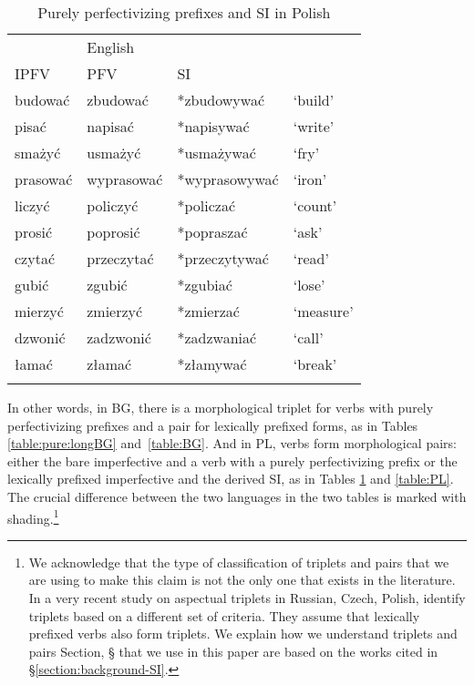 \documentclass[output=paper,colorlinks,citecolor=brown]{langscibook}
\begin{document}
\begin{table}
\begin{tabularx}{.8\textwidth}{XXll}
\lsptoprule
\multicolumn{3}{c}{Polish}  & {English}\\
\cmidrule{1-3}
%
IPFV & PFV & SI\\ 
\midrule
budować  & zbudować & \cellcolor{gray!15}*zbudowywać & `build'\\
pisać & napisać & \cellcolor{gray!15}*napisywać & `write’ \\
smażyć & usmażyć & \cellcolor{gray!15}*usmażywać & `fry'\\
prasować & wyprasować & \cellcolor{gray!15}*wyprasowywać & `iron' \\
liczyć & policzyć & \cellcolor{gray!15}*policzać & `count'\\ 
prosić & poprosić & \cellcolor{gray!15}*popraszać & `ask'\\
czytać & przeczytać & \cellcolor{gray!15}*przeczytywać & `read' \\
gubić & zgubić & \cellcolor{gray!15}*zgubiać & `lose' \\
mierzyć & zmierzyć & \cellcolor{gray!15}*zmierzać & `measure' \\
dzwonić & zadzwonić & \cellcolor{gray!15}*zadzwaniać & `call'\\
łamać & złamać & \cellcolor{gray!15}*złamywać & `break' \\ 
\lspbottomrule
\end{tabularx}
\caption{Purely perfectivizing prefixes and SI in Polish}
\label{table:pure:longPL}
\end{table}





In other words, in BG, there is a morphological triplet for  verbs with purely perfectivizing prefixes and a pair for lexically prefixed forms, as in Tables \ref{table:pure:longBG} and~\ref{table:BG}. 
And in PL, verbs form morphological pairs: either the bare imperfective and a verb with a purely perfectivizing prefix or the lexically prefixed imperfective and the derived SI, as in Tables \ref{table:pure:longPL} and \ref{table:PL}. The crucial difference between the two languages in the two tables is marked with shading.\footnote{
We acknowledge that the type of classification of triplets and pairs that we are using to make this claim is not the only one that exists in the literature. In a very recent study on aspectual triplets in Russian, Czech, Polish, \citet{wiemer-et-al-20} identify triplets based on a different set of criteria. They assume that lexically prefixed verbs also form triplets. We explain how we understand triplets and pairs Section, \S {} that we use in this paper  are  based on the works cited in \S \ref{section:background-SI}.
  
}
 
\end{document}
